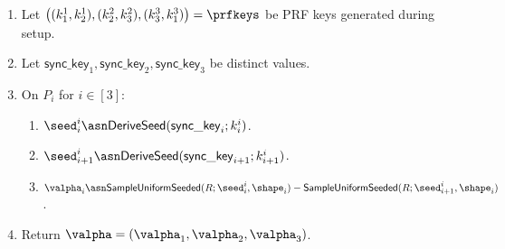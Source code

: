   \begin{enumerate}
  \item Let $\left( (k_1^1, k_2^1), (k_2^2, k_3^2), (k_3^3, k_1^3) \right) = \prfkeys$ be PRF keys generated during setup.

  \item Let $\mathsf{sync\_key}_1, \mathsf{sync\_key}_2, \mathsf{sync\_key}_3$ be distinct values.

  \item On $P_i$ for $i \in [3]$:
  \begin{enumerate}
    \item ${\seed}^i_i \asn \mathsf{DeriveSeed}(\mathsf{sync\_key}_i; k^i_i)$.
    \item ${\seed}^i_{i+1} \asn \mathsf{DeriveSeed}(\mathsf{sync\_key}_{i + 1}; k^i_{i+1})$.
    \item $\valpha_i \asn \mathsf{SampleUniformSeeded}(R; \seed^i_i, \shape_i) - \mathsf{SampleUniformSeeded}(R; \seed^i_{i+1}, \shape_i)$.
  \end{enumerate}

  \item Return $\valpha = \left( \valpha_1, \valpha_2, \valpha_3 \right)$.
  \end{enumerate}
